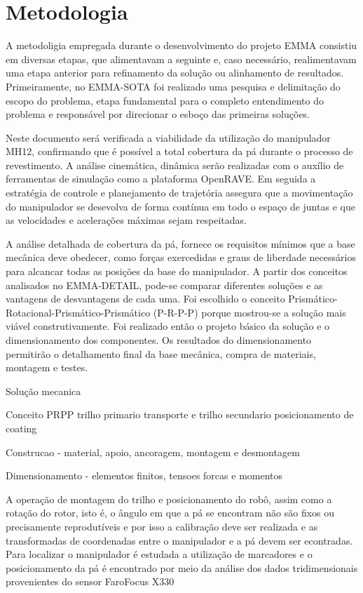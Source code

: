 \section{Metodologia}


A metodoligia empregada durante o desenvolvimento do projeto EMMA consistiu em
diversas etapas, que alimentavam a seguinte e, caso necessário,
realimentavam uma etapa anterior para refinamento da solução ou alinhamento de
resultados. Primeiramente, no EMMA-SOTA foi realizado uma pesquisa e delimitação
do escopo do problema, etapa fundamental para o completo entendimento do problema e
responsável por direcionar o esboço das primeiras soluções. 

Neste documento será verificada a viabilidade da utilização do manipulador MH12,
confirmando que é possível a total cobertura da pá durante o processo de
revestimento. A análise cinemática, dinâmica serão realizadas com o auxílio de
ferramentas de simulação como a plataforma OpenRAVE. Em seguida a estratégia de
controle e planejamento de trajetória assegura que a movimentação do manipulador
se desevolva de forma contínua em todo o espaço de juntas e que as velocidades e
acelerações máximas sejam respeitadas.

A análise detalhada de cobertura da pá, fornece os requisitos mínimos que a base
mecânica deve obedecer, como forças exercedidas e graus de liberdade necessários
para alcancar todas as posições da base do manipulador. A partir dos conceitos
analisados no EMMA-DETAIL, pode-se comparar diferentes soluções e as vantagens
de desvantagens de cada uma. Foi escolhido o conceito
Prismático-Rotacional-Prismático-Prismático (P-R-P-P) porque mostrou-se a
solução mais viável construtivamente. Foi realizado então o projeto básico da
solução e o dimensionamento dos componentes. Os resultados do dimensionamento
permitirão o detalhamento final da base mecânica, compra de materiais, montagem
e testes.





Solução mecanica

Conceito PRPP trilho primario transporte e trilho secundario posicionamento de
coating

Construcao - material, apoio, ancoragem, montagem e desmontagem

Dimensionamento - elementos finitos, tensoes forcas e momentos

A operação de montagem do trilho e posicionamento do robô, assim como
a rotação do rotor, isto é, o ângulo em que a pá se encontram não são fixos ou
precisamente reprodutíveis e por isso a calibração deve ser realizada e as
transformadas de coordenadas entre o manipulador e a pá devem ser econtradas.
Para localizar o manipulador é estudada a utilização de marcadores e o
posicionamento da pá é encontrado por meio da análise dos dados tridimensionais
provenientes do sensor Faro\textregistered Focus X330
